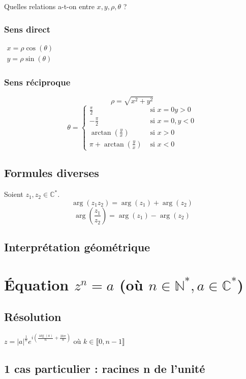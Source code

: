\documentclass[12pt,a4paper,french]{book}
\begin{document}
		Quelles relations a-t-on entre $x,y,\rho,\theta$ ?
			\subsubsection{Sens direct}
			$\begin{array}{ll}
				x = \rho \cos(\theta) \\
				y = \rho \sin(\theta)
			\end{array}$
			\subsubsection{Sens réciproque}
			\begin{equation*}
				\rho = \sqrt{x^2 + y^2}
			\end{equation*}
			\begin{equation*}
				\theta = \left\{ \begin{array}{ll}
					\frac{\pi}{2} &\mbox{ si } x = 0 y > 0\\
					-\frac{\pi}{2} &\mbox{ si } x = 0, y < 0\\
					\arctan\left(\frac{y}{x}\right) &\mbox{ si } x > 0\\
					\pi + \arctan\left(\frac{y}{x}\right) &\mbox{ si } x < 0
				\end{array}\right.
			\end{equation*}
		\subsection{Formules diverses}
		Soient $z_1,z_2 \in \mathbb{C}^\ast$.
		\[\operatorname{arg}(z_1 z_2) = \operatorname{arg}(z_1)+\operatorname{arg}(z_2)\]
		\[\operatorname{arg}\left(\frac{z_1}{z_2}\right) = \operatorname{arg}(z_1)-\operatorname{arg}(z_2)\]
		\subsection{Interprétation géométrique}
	\section{Équation $z^{n}=a$ (où $n\in \mathbb{N}^{\ast},a\in \mathbb{C}^{\ast}$)}
		\subsection{Résolution}
		$z = \left|a\right|^{\frac{1}{n}} e^{i\left(\frac{\operatorname{arg}(a)}{n} + \frac{2k\pi}{n}\right)}$ où $k \in  \llbracket 0,n-1 \rrbracket$
		\subsection{1 cas particulier : racines n de l'unité}
\end{document}
